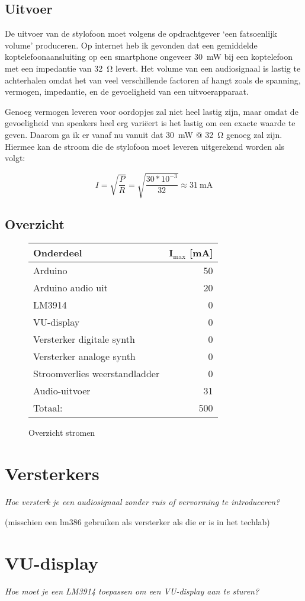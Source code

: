\documentclass[12pt, a4paper, dutch]{article}
\newcommand{\sub}[1]{$_{\text{#1}}$}
\begin{document}
\subsection{Uitvoer}

De uitvoer van de stylofoon moet volgens de opdrachtgever `een fatsoenlijk volume'
produceren. Op internet heb ik gevonden dat een gemiddelde koptelefoonaansluiting op
een smartphone ongeveer \SI{30}{\milli\watt} bij een koptelefoon met een impedantie
van \SI{32}{\ohm} levert. Het volume van een audiosignaal is lastig te achterhalen
omdat het van veel verschillende factoren af hangt zoals de spanning, vermogen,
impedantie, en de gevoeligheid van een uitvoerapparaat.

Genoeg vermogen leveren voor oordopjes zal niet heel lastig zijn, maar omdat de
gevoeligheid van speakers heel erg vari\"eert is het lastig om een exacte waarde te
geven. Daarom ga ik er vanaf nu vanuit dat \SI{30}{\milli\watt} @ \SI{32}{\ohm}
genoeg zal zijn. Hiermee kan de stroom die de stylofoon moet leveren uitgerekend
worden als volgt:

\[
I=\sqrt{\frac{P}{R}} = \sqrt{\frac{30*10^{-3}}{32}} \approx \SI{31}{\milli\ampere}
\]

\subsection{Overzicht}

\begin{figure}[H]
\centering
\begin{tabular}{lr}
\toprule
Onderdeel & I\sub{max} [\si{\milli\ampere}]\\
\midrule
Arduino & \num{50} \\
Arduino audio uit & \num{20} \\
LM3914 & \num{0} \\
VU-display & \num{0} \\
Versterker digitale synth & \num{0} \\
Versterker analoge synth & \num{0} \\
Stroomverlies weerstandladder & \num{0} \\
Audio-uitvoer & \num{31} \\
\midrule
\hfill Totaal: & \num{500} \\
\bottomrule
\end{tabular}
\caption{Overzicht stromen}
\end{figure}

\section{Versterkers}

\textit{Hoe versterk je een audiosignaal zonder ruis of vervorming te introduceren?}

(misschien een lm386 gebruiken als versterker als die er is in het techlab)

\section{VU-display}

\textit{Hoe moet je een LM3914 toepassen om een VU-display aan te sturen?}
\end{document}
